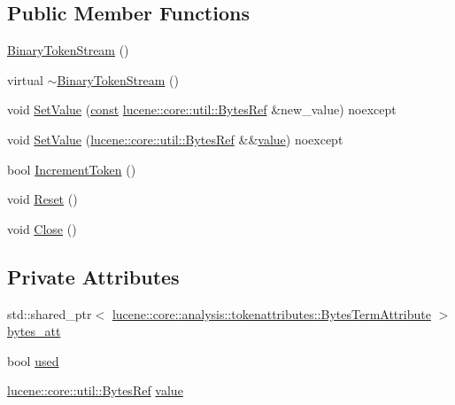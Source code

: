 \subsection*{Public Member Functions}
\begin{DoxyCompactItemize}
\item 
\mbox{\hyperlink{classlucene_1_1core_1_1document_1_1Field_1_1BinaryTokenStream_a24a97190071bfedab20a0db755928732}{Binary\+Token\+Stream}} ()
\item 
virtual \mbox{\hyperlink{classlucene_1_1core_1_1document_1_1Field_1_1BinaryTokenStream_aac6e4bf25db86723dba21faf789de9d0}{$\sim$\+Binary\+Token\+Stream}} ()
\item 
void \mbox{\hyperlink{classlucene_1_1core_1_1document_1_1Field_1_1BinaryTokenStream_af69fef506c491a451cb5ac1bca9f3ac4}{Set\+Value}} (\mbox{\hyperlink{ZlibCrc32_8h_a2c212835823e3c54a8ab6d95c652660e}{const}} \mbox{\hyperlink{classlucene_1_1core_1_1util_1_1BytesRef}{lucene\+::core\+::util\+::\+Bytes\+Ref}} \&new\+\_\+value) noexcept
\item 
void \mbox{\hyperlink{classlucene_1_1core_1_1document_1_1Field_1_1BinaryTokenStream_a6c5fcb0fc5397ab56af07a57e2d6544c}{Set\+Value}} (\mbox{\hyperlink{classlucene_1_1core_1_1util_1_1BytesRef}{lucene\+::core\+::util\+::\+Bytes\+Ref}} \&\&\mbox{\hyperlink{classlucene_1_1core_1_1document_1_1Field_1_1BinaryTokenStream_af19e816feca1fda691a9f8ad505ac97a}{value}}) noexcept
\item 
bool \mbox{\hyperlink{classlucene_1_1core_1_1document_1_1Field_1_1BinaryTokenStream_a98dee5401b26bdaab935f66a37abae29}{Increment\+Token}} ()
\item 
void \mbox{\hyperlink{classlucene_1_1core_1_1document_1_1Field_1_1BinaryTokenStream_adc2b2b0a6ea02054dfe5159628861911}{Reset}} ()
\item 
void \mbox{\hyperlink{classlucene_1_1core_1_1document_1_1Field_1_1BinaryTokenStream_a40c73dd8eae9ab36e7e8f9e859a037ae}{Close}} ()
\end{DoxyCompactItemize}
\subsection*{Private Attributes}
\begin{DoxyCompactItemize}
\item 
std\+::shared\+\_\+ptr$<$ \mbox{\hyperlink{classlucene_1_1core_1_1analysis_1_1tokenattributes_1_1BytesTermAttribute}{lucene\+::core\+::analysis\+::tokenattributes\+::\+Bytes\+Term\+Attribute}} $>$ \mbox{\hyperlink{classlucene_1_1core_1_1document_1_1Field_1_1BinaryTokenStream_a3a9a7f10f40cde8b2c37b9e65340083c}{bytes\+\_\+att}}
\item 
bool \mbox{\hyperlink{classlucene_1_1core_1_1document_1_1Field_1_1BinaryTokenStream_a56fb807096b736bcc128ced9cabf98f0}{used}}
\item 
\mbox{\hyperlink{classlucene_1_1core_1_1util_1_1BytesRef}{lucene\+::core\+::util\+::\+Bytes\+Ref}} \mbox{\hyperlink{classlucene_1_1core_1_1document_1_1Field_1_1BinaryTokenStream_af19e816feca1fda691a9f8ad505ac97a}{value}}
\end{DoxyCompactItemize}
